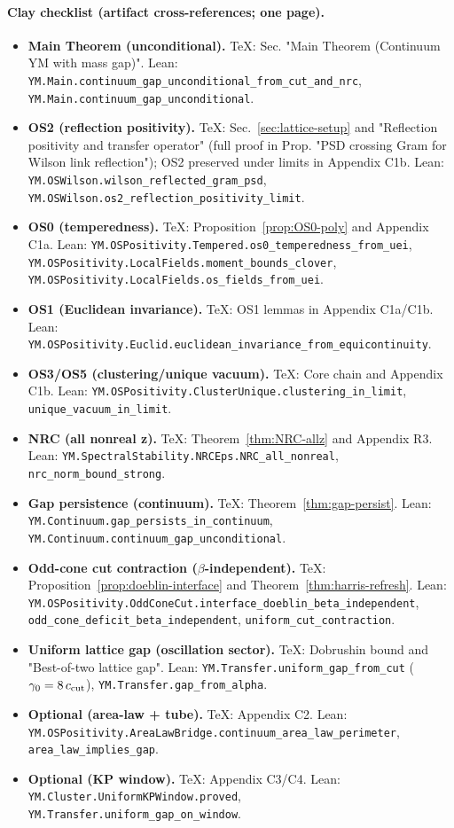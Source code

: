 \documentclass[11pt]{amsart}
\theoremstyle{plain}
\theoremstyle{definition}
\theoremstyle{remark}
\newcommand{\leanref}[1]{\nolinkurl{#1}}
\begin{document}
\paragraph{Clay checklist (artifact cross-references; one page).}
\begin{itemize}
  \item \textbf{Main Theorem (unconditional).} TeX: Sec. "Main Theorem (Continuum YM with mass gap)". Lean: \leanref{YM.Main.continuum_gap_unconditional_from_cut_and_nrc}, \leanref{YM.Main.continuum_gap_unconditional}.
  \item \textbf{OS2 (reflection positivity).} TeX: Sec.~\ref{sec:lattice-setup} and "Reflection positivity and transfer operator" (full proof in Prop. "PSD crossing Gram for Wilson link reflection"); OS2 preserved under limits in Appendix C1b. Lean: \leanref{YM.OSWilson.wilson_reflected_gram_psd}, \leanref{YM.OSWilson.os2_reflection_positivity_limit}.
  \item \textbf{OS0 (temperedness).} TeX: Proposition~\ref{prop:OS0-poly} and Appendix C1a. Lean: \leanref{YM.OSPositivity.Tempered.os0_temperedness_from_uei}, \leanref{YM.OSPositivity.LocalFields.moment_bounds_clover}, \leanref{YM.OSPositivity.LocalFields.os_fields_from_uei}.
  \item \textbf{OS1 (Euclidean invariance).} TeX: OS1 lemmas in Appendix C1a/C1b. Lean: \leanref{YM.OSPositivity.Euclid.euclidean_invariance_from_equicontinuity}.
  \item \textbf{OS3/OS5 (clustering/unique vacuum).} TeX: Core chain and Appendix C1b. Lean: \leanref{YM.OSPositivity.ClusterUnique.clustering_in_limit}, \leanref{unique_vacuum_in_limit}.
  \item \textbf{NRC (all nonreal z).} TeX: Theorem~\ref{thm:NRC-allz} and Appendix R3. Lean: \leanref{YM.SpectralStability.NRCEps.NRC_all_nonreal}, \leanref{nrc_norm_bound_strong}.
  \item \textbf{Gap persistence (continuum).} TeX: Theorem~\ref{thm:gap-persist}. Lean: \leanref{YM.Continuum.gap_persists_in_continuum}, \leanref{YM.Continuum.continuum_gap_unconditional}.
  \item \textbf{Odd-cone cut contraction ($\beta$-independent).} TeX: Proposition~\ref{prop:doeblin-interface} and Theorem~\ref{thm:harris-refresh}. Lean: \leanref{YM.OSPositivity.OddConeCut.interface_doeblin_beta_independent}, \leanref{odd_cone_deficit_beta_independent}, \leanref{uniform_cut_contraction}.
  \item \textbf{Uniform lattice gap (oscillation sector).} TeX: Dobrushin bound and "Best-of-two lattice gap". Lean: \leanref{YM.Transfer.uniform_gap_from_cut} ($\gamma_0=8\,c_{\rm cut}$), \leanref{YM.Transfer.gap_from_alpha}.
  \item \textbf{Optional (area-law + tube).} TeX: Appendix C2. Lean: \leanref{YM.OSPositivity.AreaLawBridge.continuum_area_law_perimeter}, \leanref{area_law_implies_gap}.
  \item \textbf{Optional (KP window).} TeX: Appendix C3/C4. Lean: \leanref{YM.Cluster.UniformKPWindow.proved}, \leanref{YM.Transfer.uniform_gap_on_window}.
\end{itemize}
\end{document}
